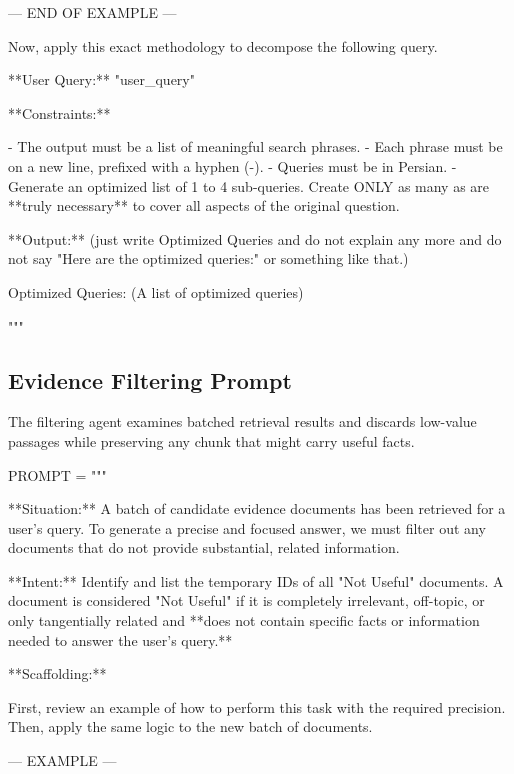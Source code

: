 \documentclass[11pt]{article}
\begin{document}
\begin{PromptBlock}

--- END OF EXAMPLE ---

Now, apply this exact methodology to decompose the following query.

**User Query:** "{user_query}"

**Constraints:**

- The output must be a list of meaningful search phrases.
- Each phrase must be on a new line, prefixed with a hyphen (-).
- Queries must be in Persian.
- Generate an optimized list of 1 to 4 sub-queries. Create ONLY as many as are **truly necessary** to cover all aspects of the original question.

**Output:** (just write Optimized Queries and do not explain any more and do not say "Here are the optimized queries:" or something like that.)

Optimized Queries: (A list of optimized queries)

"""
\end{PromptBlock}

\subsection{Evidence Filtering Prompt}

The filtering agent examines batched retrieval results and discards low-value passages while preserving any chunk that might carry useful facts.

\begin{PromptBlock}
PROMPT = """

**Situation:** A batch of candidate evidence documents has been retrieved for a user's query. To generate a precise and focused answer, we must filter out any documents that do not provide substantial, related information.

**Intent:** Identify and list the temporary IDs of all "Not Useful" documents. A document is considered "Not Useful" if it is completely irrelevant, off-topic, or only tangentially related and **does not contain specific facts or information needed to answer the user's query.**

**Scaffolding:**

First, review an example of how to perform this task with the required precision. Then, apply the same logic to the new batch of documents.

--- EXAMPLE ---
\end{PromptBlock}
\end{document}

